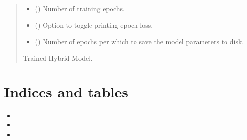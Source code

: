 \documentclass[letterpaper,10pt,english]{sphinxmanual}
\begin{document}
\begin{fulllineitems}
\begin{quote}
\begin{description}
\begin{itemize}
\item {} 
\sphinxAtStartPar
{} () \textendash{} Number of training epochs.

\item {} 
\sphinxAtStartPar
{} () \textendash{} Option to toggle printing epoch loss.

\item {} 
\sphinxAtStartPar
{} () \textendash{} Number of epochs per which to save the model parameters to disk.

\end{itemize}

\sphinxAtStartPar
Trained Hybrid Model.

\end{description}\end{quote}

\end{fulllineitems}



\chapter{Indices and tables}
\label{\detokenize{index:indices-and-tables}}\begin{itemize}
\item {} 
\sphinxAtStartPar
{}

\item {} 
\sphinxAtStartPar
{}

\item {} 
\sphinxAtStartPar
{}

\end{itemize}


\renewcommand{\indexname}{Python Module Index}
\begin{sphinxtheindex}
\let\bigletter\sphinxstyleindexlettergroup
\bigletter{h}
\item\relax{}
\item\relax{}
\item\relax{}
\item\relax{}
\end{sphinxtheindex}

\renewcommand{\indexname}{Index}
\printindex
\end{document}
